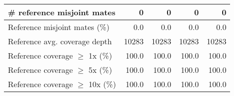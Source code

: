 \documentclass[12pt,a4paper]{article}
\begin{document}
\begin{table}[ht]
\begin{center}
\begin{tabular}{|l*{4}{|r}|}
\# reference misjoint mates & 0 & 0 & 0 & 0 \\ \hline
Reference misjoint mates (\%) & 0.0 & 0.0 & 0.0 & 0.0 \\ \hline
Reference avg. coverage depth & 10283 & 10283 & 10283 & 10283 \\ \hline
Reference coverage $\geq$ 1x (\%) & 100.0 & 100.0 & 100.0 & 100.0 \\ \hline
Reference coverage $\geq$ 5x (\%) & 100.0 & 100.0 & 100.0 & 100.0 \\ \hline
Reference coverage $\geq$ 10x (\%) & 100.0 & 100.0 & 100.0 & 100.0 \\ \hline
\end{tabular}
\end{center}
\end{table}
\end{document}
